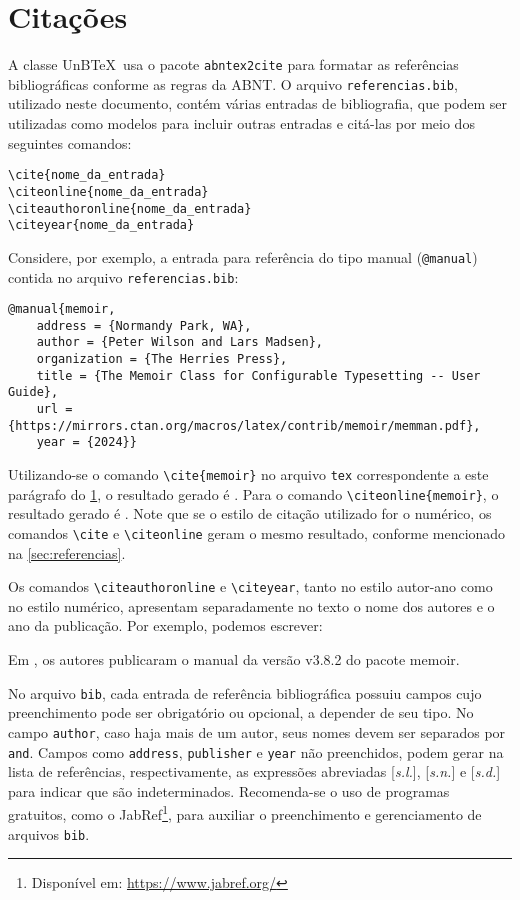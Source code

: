\chapter{Citações}\label{apd:cit}

A classe UnB\TeX\ usa o pacote \texttt{abntex2cite} para formatar as referências bibliográficas conforme as regras da ABNT. O arquivo \texttt{referencias.bib}, utilizado neste documento, contém várias entradas de bibliografia, que podem ser utilizadas como modelos para incluir outras entradas e citá-las por meio dos seguintes comandos:
\begin{verbatim}
\cite{nome_da_entrada}
\citeonline{nome_da_entrada}
\citeauthoronline{nome_da_entrada}
\citeyear{nome_da_entrada}
\end{verbatim}

Considere, por exemplo, a entrada para referência do tipo manual (\texttt{@manual}) contida no arquivo \texttt{referencias.bib}:
\begin{verbatim}
@manual{memoir,
    address = {Normandy Park, WA},
    author = {Peter Wilson and Lars Madsen},
    organization = {The Herries Press},
    title = {The Memoir Class for Configurable Typesetting -- User Guide},
    url = {https://mirrors.ctan.org/macros/latex/contrib/memoir/memman.pdf},
    year = {2024}}
\end{verbatim}

Utilizando-se o comando \verb|\cite{memoir}| no arquivo \texttt{tex} correspondente a este parágrafo do \cref{apd:cit}, o resultado gerado é \cite{memoir}. Para o comando \verb|\citeonline{memoir}|, o resultado gerado é . Note que se o estilo de citação utilizado for o numérico, os comandos \verb|\cite| e \verb|\citeonline| geram o mesmo resultado, conforme mencionado na \cref{sec:referencias}.

Os comandos \verb|\citeauthoronline| e \verb|\citeyear|, tanto no estilo autor-ano como no estilo numérico, apresentam separadamente no texto o nome dos autores e o ano da publicação. Por exemplo, podemos escrever:

\begin{mdframed}[style=plainSty,innertopmargin=8pt] %
Em \citeyear{memoir}, os autores  publicaram o manual da versão v3.8.2 do pacote \textsf{memoir}.
\end{mdframed}

No arquivo \texttt{bib}, cada entrada de referência bibliográfica possuiu campos cujo preenchimento pode ser obrigatório ou opcional, a depender de seu tipo. No campo \texttt{author}, caso haja mais de um autor, seus nomes devem ser separados por \texttt{and}. Campos como \texttt{address}, \texttt{publisher} e \texttt{year} não preenchidos, podem gerar na lista de referências, respectivamente, as expressões abreviadas [\emph{s.l.}], [\emph{s.n.}] e [\emph{s.d.}] para indicar que são indeterminados. Recomenda-se o uso de programas gratuitos, como o JabRef\footnote{Disponível em: \url{https://www.jabref.org/}}, para auxiliar o preenchimento e gerenciamento de arquivos \texttt{bib}.

